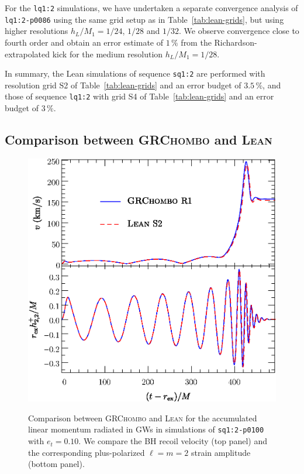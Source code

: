 \documentclass[floats,floatfix,showpacs,amssymb,physrev,twocolumn,superscriptaddress,reprint,
nofootinbib, longbibliography]{revtex4-2}
\begin{document}
For the \texttt{lq1:2} simulations, we have undertaken a separate
convergence analysis of \texttt{lq1:2-p0086} using the same grid
setup as in
Table~\ref{tab:lean-grids}, but using higher resolutions
$h_L/M_1=1/24$, $1/28$ and $1/32$. We observe convergence close to
fourth order and obtain an error estimate of $1\,\%$ from
the Richardson-extrapolated kick for the medium resolution
$h_L/M_1=1/28$.

In summary, the {\sc Lean} simulations of sequence \texttt{sq1:2} are
performed with resolution grid S2 of Table~\ref{tab:lean-grids} and an
error budget of $3.5\,\%$, and those of sequence \texttt{lq1:2} with
grid S4 of Table~\ref{tab:lean-grids} and an error budget of $3\,\%$.

\subsection{Comparison between \textsc{GRChombo} and \textsc{Lean}}
\label{sec:code-comparison}
\begin{figure}[t]
    {
    \centering
    \includegraphics[width=\columnwidth]{grchombo-lean-comparison3.eps}
    }
    \caption{Comparison between \textsc{GRChombo} and \textsc{Lean} 
    for the accumulated linear momentum radiated in GWs in simulations 
    of \texttt{sq1:2-p0100} with $e_t=0.10$.
    We compare the BH recoil velocity (top panel)
    and the corresponding plus-polarized $\ell=m=2$ strain
    amplitude (bottom panel).
    }
    \label{fig:grchombo-lean-comparison}
\end{figure}
\end{document}
